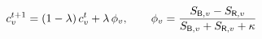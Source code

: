 
\color{ink}$\displaystyle
c^{t+1}_v=(1-\lambda)\,c^t_v+\lambda\,\phi_v,\qquad \phi_v=\frac{S_{\mathsf{B},v}-S_{\mathsf{R},v}}{S_{\mathsf{B},v}+S_{\mathsf{R},v}+\kappa}
$
